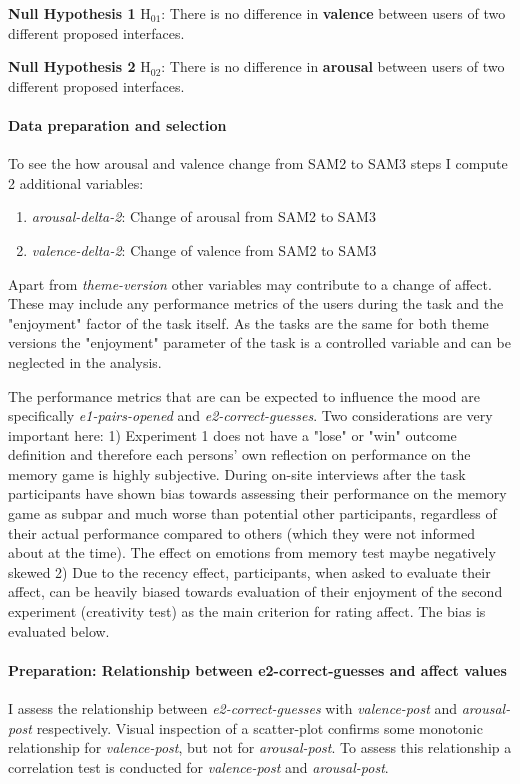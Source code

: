 	\textbf{Null Hypothesis 1} H$_{01}$: There is no difference in \textbf{valence} between users of two different proposed interfaces.
	
	\textbf{Null Hypothesis 2} H$_{02}$: There is no difference in \textbf{arousal} between users of two different proposed interfaces.
	
	\paragraph{Data preparation and selection}
	
	To see the how arousal and valence change from SAM2 to SAM3 steps I compute 2 additional variables:
	
	\begin{enumerate}
		\item \textit{arousal-delta-2}: Change of arousal from SAM2 to SAM3
		\item \textit{valence-delta-2}: Change of valence from SAM2 to SAM3
	\end{enumerate}
	
	Apart from \textit{theme-version} other variables may contribute to a change of affect. These may include any performance metrics of the users during the task and the "enjoyment" factor of the task itself. As the tasks are the same for both theme versions the "enjoyment" parameter of the task is a controlled variable and can be neglected in the analysis.
	
	The performance metrics that are can be expected to influence the mood are specifically \textit{e1-pairs-opened} and \textit{e2-correct-guesses}. Two considerations are very important here: 1) Experiment 1 does not have a "lose" or "win" outcome definition and therefore each persons' own reflection on performance on the memory game is highly subjective. During on-site interviews after the task participants have shown bias towards assessing their performance on the memory game as subpar and much worse than potential other participants, regardless of their actual performance compared to others (which they were not informed about at the time). The effect on emotions from memory test maybe negatively skewed 2) Due to the recency effect, participants, when asked to evaluate their affect, can be heavily biased towards evaluation of their enjoyment of the second experiment (creativity test) as the main criterion for rating affect. The bias is evaluated below.
	
	\paragraph{Preparation: Relationship between e2-correct-guesses and affect values} 
	I assess the relationship between \textit{e2-correct-guesses} with \textit{valence-post} and \textit{arousal-post} respectively. 
	Visual inspection of a scatter-plot confirms some monotonic relationship for \textit{valence-post}, but not for \textit{arousal-post}.
	To assess this relationship a correlation test is conducted for \textit{valence-post} and \textit{arousal-post}.
	
